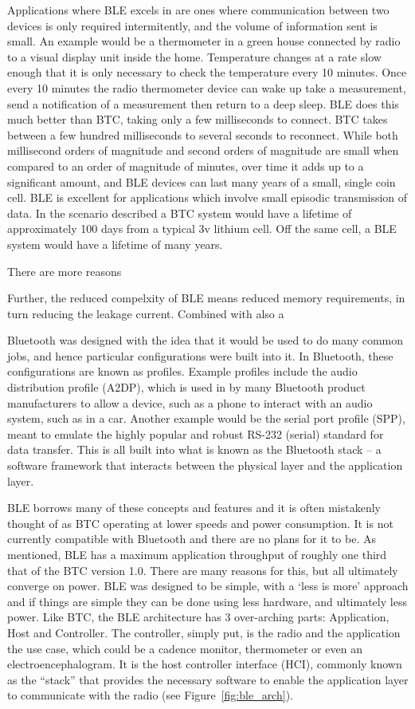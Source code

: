 \documentclass[]{article}
\begin{document}
Applications where \ac{BLE} excels in are ones where communication between two devices is only required intermitently, and the volume of information sent is small. An example would be a thermometer in a green house connected by radio to a visual display unit inside the home. Temperature changes at a rate slow enough that it is only necessary to check the temperature every 10 minutes. Once every 10 minutes the radio thermometer device can wake up take a measurement, send a notification of a measurement then return to a deep sleep. \ac{BLE} does this much better than \ac{BTC}, taking only a few milliseconds to connect. \ac{BTC} takes between a few hundred milliseconds to several seconds to reconnect. While both millisecond orders of magnitude and second orders of magnitude are small when compared to an order of magnitude of minutes, over time it adds up to a significant amount, and \ac{BLE} devices can last many years of a small, single coin cell. \ac{BLE} is excellent for applications which involve small episodic transmission of data. In the scenario described a \ac{BTC} system would have a lifetime of approximately 100 days from a typical 3v lithium cell. Off the same cell, a \ac{BLE} system would have a lifetime of many years.

There are more reasons 


Further, the reduced compelxity of \ac{BLE} means reduced memory requirements, in turn reducing the leakage current. Combined with also a 

Bluetooth was designed with the idea that it would be used to do many common jobs, and hence particular configurations were built into it. In Bluetooth, these configurations are known as profiles. Example profiles include the audio distribution profile (A2DP), which is used in by many Bluetooth product manufacturers to allow a device, such as a phone to interact with an audio system, such as in a car. Another example would be the serial port profile (SPP), meant to emulate the highly popular and robust RS-232 (serial) standard for data transfer. This is all built into what is known as the Bluetooth stack – a software framework that interacts between the physical layer and the application layer.  

BLE borrows many of these concepts and features and it is often mistakenly thought of as \ac{BTC} operating at lower speeds and power consumption. It is not currently compatible with Bluetooth and there are no plans for it to be. As mentioned, \ac{BLE} has a maximum application throughput of roughly one third that of the \ac{BTC} version 1.0. There are many reasons for this, but all ultimately converge on power. BLE was designed to be simple, with a ‘less is more’ approach and if things are simple they can be done using less hardware, and ultimately less power. Like \ac{BTC}, the \ac{BLE} architecture has 3 over-arching parts: Application, Host and Controller. The controller, simply put, is the radio and the application the use case, which could be a cadence monitor, thermometer or even an electroencephalogram. It is the host controller interface (HCI), commonly known as the “stack” that provides the necessary software to enable the application layer to communicate with the radio (see Figure~\ref{fig:ble_arch}).
\end{document}
